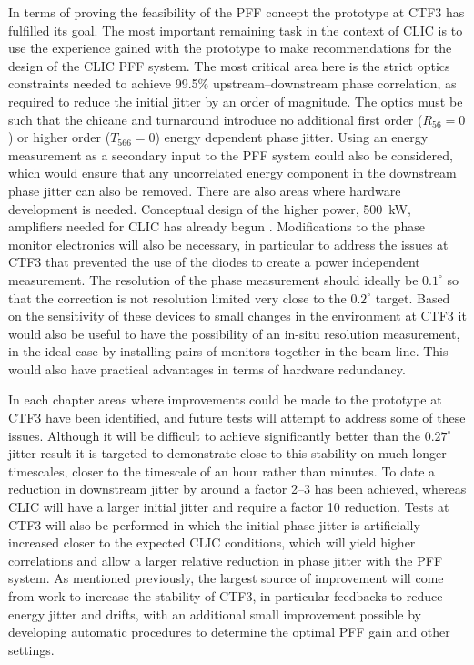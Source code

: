 
In terms of proving the feasibility of the PFF concept the prototype at CTF3 has fulfilled its goal.  The most important remaining task in the context of CLIC is to use the experience gained with the prototype to make recommendations for the design of the CLIC PFF system. The most critical area here is the strict optics constraints needed to achieve 99.5\% upstream--downstream phase correlation, as required to reduce the initial jitter by an order of magnitude. The optics must be such that the chicane and turnaround introduce no additional first order (\(R_{56} = 0\)) or higher order (\(T_{566} = 0\)) energy dependent phase jitter. Using an energy measurement as a secondary input to the PFF system could also be considered, which would ensure that any uncorrelated energy component in the downstream phase jitter can also be removed. There are also areas where hardware development is needed. Conceptual design of the higher power, 500~kW, amplifiers needed for CLIC has already begun \cite{colinCLIC16}. Modifications to the phase monitor electronics will also be necessary, in particular to address the issues at CTF3 that prevented the use of the diodes to create a power independent measurement. The resolution of the phase measurement should ideally be \(0.1^\circ\) so that the correction is not resolution limited very close to the \(0.2^\circ\) target. Based on the sensitivity of these devices to small changes in the environment at CTF3 it would also be useful to have the possibility of an in-situ resolution measurement, in the ideal case by installing pairs of monitors together in the beam line. This would also have practical advantages in terms of hardware redundancy.

In each chapter areas where improvements could be made to the prototype at CTF3 have been identified, and future tests will attempt to address some of these issues. Although it will be difficult to achieve significantly better than the \(0.27^\circ\) jitter result it is targeted to demonstrate close to this stability on much longer timescales, closer to the timescale of an hour rather than minutes. To date a reduction in downstream jitter by around a factor 2--3 has been achieved, whereas CLIC will have a larger initial jitter and require a factor 10 reduction. Tests at CTF3 will also be performed in which the initial phase jitter is artificially increased closer to the expected CLIC conditions, which will yield higher correlations and allow a larger relative reduction in phase jitter with the PFF system. As mentioned previously, the largest source of improvement will come from work to increase the stability of CTF3, in particular feedbacks to reduce energy jitter and drifts, with an additional small improvement possible by developing automatic procedures to determine the optimal PFF gain and other settings.

